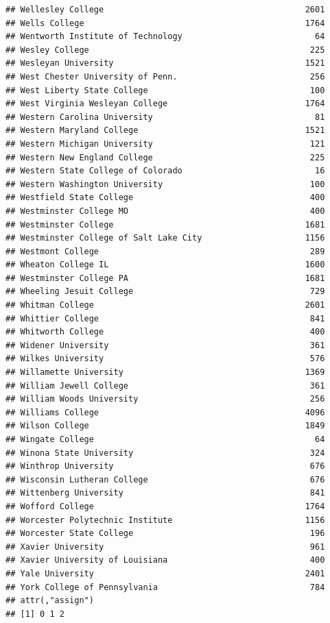 \documentclass[
]{article}
\begin{document}
\begin{verbatim}
## Wellesley College                                         2601
## Wells College                                             1764
## Wentworth Institute of Technology                           64
## Wesley College                                             225
## Wesleyan University                                       1521
## West Chester University of Penn.                           256
## West Liberty State College                                 100
## West Virginia Wesleyan College                            1764
## Western Carolina University                                 81
## Western Maryland College                                  1521
## Western Michigan University                                121
## Western New England College                                225
## Western State College of Colorado                           16
## Western Washington University                              100
## Westfield State College                                    400
## Westminster College MO                                     400
## Westminster College                                       1681
## Westminster College of Salt Lake City                     1156
## Westmont College                                           289
## Wheaton College IL                                        1600
## Westminster College PA                                    1681
## Wheeling Jesuit College                                    729
## Whitman College                                           2601
## Whittier College                                           841
## Whitworth College                                          400
## Widener University                                         361
## Wilkes University                                          576
## Willamette University                                     1369
## William Jewell College                                     361
## William Woods University                                   256
## Williams College                                          4096
## Wilson College                                            1849
## Wingate College                                             64
## Winona State University                                    324
## Winthrop University                                        676
## Wisconsin Lutheran College                                 676
## Wittenberg University                                      841
## Wofford College                                           1764
## Worcester Polytechnic Institute                           1156
## Worcester State College                                    196
## Xavier University                                          961
## Xavier University of Louisiana                             400
## Yale University                                           2401
## York College of Pennsylvania                               784
## attr(,"assign")
## [1] 0 1 2
\end{verbatim}
\end{document}
